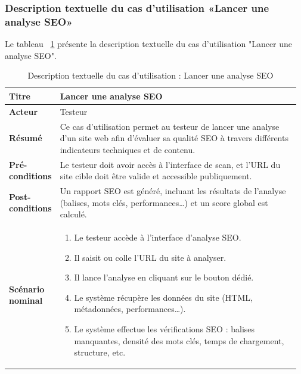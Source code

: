     \subsubsection{Description textuelle du cas d’utilisation «Lancer une analyse SEO»}    
            Le tableau ~\ref{tab:descAnalyseSEO} présente la description textuelle du cas d’utilisation "Lancer une analyse SEO".
            \begin{spacing}{1.2}
                \begin{longtable}{|p{0.12\linewidth}|p{0.85\linewidth}|}
                \caption{Description textuelle du cas d’utilisation : Lancer une analyse SEO}
                \label{tab:descAnalyseSEO}\\
                \hline
                \textbf{Titre} & Lancer une analyse SEO\\ 
                \hline
                \textbf{Acteur} & Testeur \\
                \hline
                \textbf{Résumé} & Ce cas d'utilisation permet au testeur de lancer une analyse d'un site web afin d'évaluer sa qualité SEO à travers différents indicateurs techniques et de contenu. \\
                \hline
                \textbf{Pré-conditions} &
                Le testeur doit avoir accès à l’interface de scan, et l’URL du site cible doit être valide et accessible publiquement. \\
                \hline
                \textbf{Post-conditions} &
                Un rapport SEO est généré, incluant les résultats de l’analyse (balises, mots clés, performances…) et un score global est calculé. \\
                \hline
                \textbf{Scénario nominal} &
                \begin{minipage}{0.83\textwidth}
                \vspace{0.1cm}
                \begin{enumerate}[label=\arabic*.]
                \item Le testeur accède à l’interface d’analyse SEO.
                \item Il saisit ou colle l’URL du site à analyser.
                \item Il lance l’analyse en cliquant sur le bouton dédié.
                \item Le système récupère les données du site (HTML, métadonnées, performances…).
                \item Le système effectue les vérifications SEO : balises manquantes, densité des mots clés, temps de chargement, structure, etc.

\end{enumerate}
\end{minipage}
\end{longtable}
\end{spacing}
